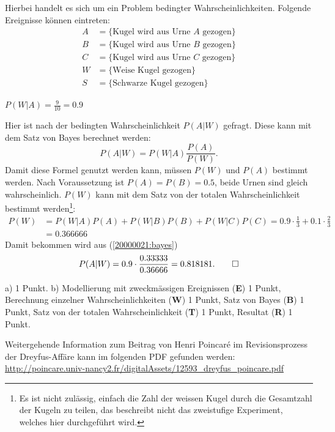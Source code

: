 
\begin{loesung}
Hierbei handelt es sich um ein Problem bedingter Wahrscheinlichkeiten.
Folgende Ereignisse können eintreten:
\begin{align*}
A&=\{\text{Kugel wird aus Urne $A$ gezogen}\}\\
B&=\{\text{Kugel wird aus Urne $B$ gezogen}\}\\
C&=\{\text{Kugel wird aus Urne $C$ gezogen}\}\\
W&=\{\text{Weise Kugel gezogen}\}\\
S&=\{\text{Schwarze Kugel gezogen}\}
\end{align*}
\begin{teilaufgaben}
\item $P(W|A)=\frac{9}{10}= 0.9$
\item Hier ist nach der bedingten Wahrscheinlichkeit $P(A|W)$ gefragt.
Diese kann mit dem Satz von Bayes berechnet werden:
\begin{equation}
P(A|W)=P(W|A)\frac{P(A)}{P(W)}.
\label{20000021:bayes}
\end{equation}
Damit diese Formel genutzt werden kann, müssen $P(W)$ und $P(A)$
bestimmt werden.
Nach Voraussetzung ist $P(A)=P(B)=0.5$, beide Urnen sind gleich
wahrscheinlich. $P(W)$ kann mit dem Satz von der totalen
Wahrscheinlichkeit bestimmt werden\footnote{Es ist nicht zulässig,
einfach die Zahl der weissen Kugel durch die Gesamtzahl der Kugeln
zu teilen, das beschreibt nicht das zweistufige Experiment, welches hier
durchgeführt wird.}:
\begin{align*}
P(W)&=P(W|A)P(A)+P(W|B)P(B)+P(W|C)P(C)
     =0.9\cdot \frac13+0.1\cdot \frac23
\\
    &=0.366666
\end{align*}
Damit bekommen wird aus
(\ref{20000021:bayes})
\[
P(A|W)=0.9\cdot\frac{0.33333}{0.36666}=0.818181.
\qedhere
\]
\end{teilaufgaben}
\end{loesung}

\begin{bewertung}
a) 1 Punkt.
b) Modellierung mit zweckmässigen Ereignissen ({\bf E}) 1 Punkt,
Berechnung einzelner Wahrscheinlichkeiten ({\bf W}) 1 Punkt,
Satz von Bayes ({\bf B}) 1 Punkt,
Satz von der totalen Wahrscheinlichkeit ({\bf T}) 1 Punkt,
Resultat ({\bf R}) 1 Punkt.
\end{bewertung}

\begin{diskussion}
Weitergehende Information zum Beitrag von Henri Poincar\'e im Revisionsprozess
der Drey\-fus-Affäre kann im folgenden PDF gefunden werden:
\url{http://poincare.univ-nancy2.fr/digitalAssets/12593_dreyfus_poincare.pdf}
\end{diskussion}


